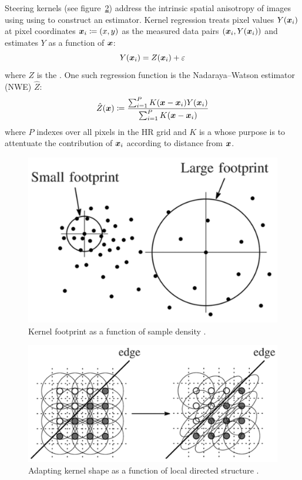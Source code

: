 Steering kernels (see figure~\ref{fig:steering}) address the intrinsic spatial anisotropy of images using using  to construct an estimator.
%
Kernel regression treats pixel values \(Y(\bm{x}_i)\) at pixel coordinates \(\bm{x}_i \coloneqq (x, y)\) as the measured data pairs \((\bm{x}_i, Y(\bm{x}_i))\) and estimates \(Y\) as a function of \(\bm{x}\):
\begin{equation}
    Y(\bm{x}_i) = Z(\bm{x}_i) + \varepsilon
\end{equation}
where \(Z\) is the .
%
One such regression function is the Nadaraya–Watson estimator (NWE) \cite{Nadaraya} \(\hat{Z}\):
\begin{equation}
    \hat{Z}(\bm{x}) \coloneqq \frac{\sum_{i=1}^{P}K(\bm{x} - \bm{x}_i)Y(\bm{x}_i)}{\sum_{i=1}^{P}K(\bm{x} - \bm{x}_i)}
    \label{eqn:kernelregression}
\end{equation}
where \(P\) indexes over all pixels in the HR grid and \(K\) is a  whose purpose is to attentuate the contribution of \(\bm{x}_i\) according to distance from \(\bm{x}\).
%
\begin{figure}[!htbp]
    \centering
    \includegraphics[width=.8\linewidth]{figures/classical/footprint.png}
    \caption{Kernel footprint as a function of sample density \cite{Takeda2007}.}
    \label{fig:footprint}
\end{figure}
\begin{figure}[!htbp]
    \centering
    \includegraphics[width=\linewidth,keepaspectratio]{figures/classical/steering.png}
    \caption{Adapting kernel shape as a function of local directed structure \cite{Takeda2007}.}
    \label{fig:steering}
\end{figure}
